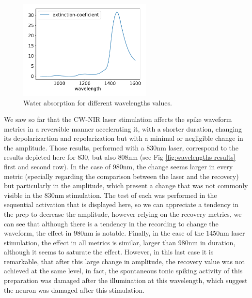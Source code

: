 \begin{figure}[hbt]
	\centering
	\includegraphics[width=0.6\textwidth]{img/laser/wavelength/water_absoption_wavelength.pdf}
    \caption{Water absorption for different wavelengths values.}
    \label{fig:water absorption}
\end{figure}

We saw so far that the CW-NIR laser stimulation affects the spike waveform metrics in a reversible manner accelerating it, with a shorter duration, changing its depolarizartion and repolarization but with a minimal or negligible change in the amplitude. Those results, performed with a 830nm laser, correspond to the results depicted here for 830, but also 808nm (see Fig \ref{fig:wavelengths results} first and second row). In the case of 980nm, the change seems larger in every metric (specially regarding the comparison between the laser and the recovery) but particularly in the amplitude, which present a change that was not commonly visible in the 830nm stimulation. The test of each was performed in the sequential activation that is displayed here, so we can appreciate a tendency in the prep to decrease the amplitude, however relying on the recovery metrics, we can see that although there is a tendency in the recording to change the waveform, the effect in 980nm is notable. Finally, in the case of the 1450nm laser stimulation, the effect in all metrics is similar, larger than 980nm in duration, although it seems to saturate the effect. However, in this last case it is remarkable, that after this large change in amplitude, the recovery value was not achieved at the same level, in fact, the spontaneous tonic spiking activity of this preparation was damaged after the illumination at this wavelength, which suggest the neuron was damaged after this stimulation. 


